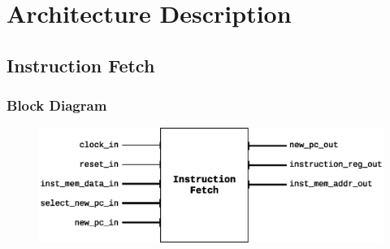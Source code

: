 \documentclass{article}
\begin{document}
%  
  
  \section{Architecture Description}
  \label{sec:architecture_description}

  \subsection{Instruction Fetch}
  \subsubsection{Block Diagram}
  \begin{figure}[H]
    \centering
    \includegraphics[width=\linewidth]{pictures/blocks/if_block.eps}
  \end{figure}    
  
\end{document}
